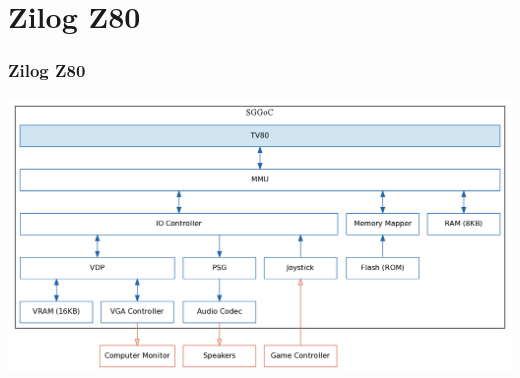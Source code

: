 \documentclass{beamer}
\begin{document}
\section{Zilog Z80}
\begin{frame}
    \frametitle{Zilog Z80}
    \begin{center}
        \includegraphics[width=\textwidth]{../block_diagrams/block_diagram_internal_tv80.png}
    \end{center}
\end{frame}
\end{document}
